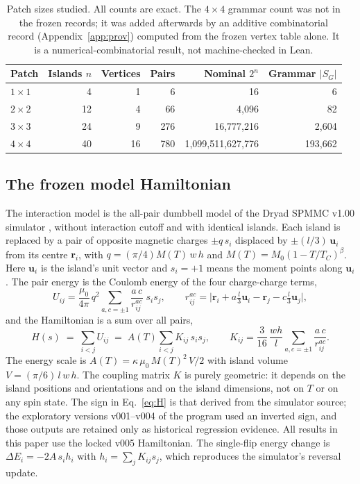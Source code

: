 \documentclass[11pt,a4paper]{article}
\theoremstyle{plain}
\theoremstyle{definition}
\theoremstyle{remark}
\newcommand{\SG}{S_{G}}
\begin{document}
\begin{table}[t]
\centering\small
\caption{Patch sizes studied. All counts are exact. The $4\times4$ grammar count was not in the frozen records; it was added afterwards by an additive combinatorial record (Appendix~\ref{app:prov}) computed from the frozen vertex table alone. It is a numerical-combinatorial result, not machine-checked in Lean.}
\label{tab:sizes}
\begin{tabular}{@{}lrrrrr@{}}
\toprule
Patch & Islands $n$ & Vertices & Pairs & Nominal $2^n$ & Grammar $|\SG|$\\
\midrule
$1\times1$ & 4 & 1 & 6 & 16 & 6\\
$2\times2$ & 12 & 4 & 66 & 4{,}096 & 82\\
$3\times3$ & 24 & 9 & 276 & 16{,}777{,}216 & 2{,}604\\
$4\times4$ & 40 & 16 & 780 & 1{,}099{,}511{,}627{,}776 & 193{,}662\\
\bottomrule
\end{tabular}
\end{table}

\subsection{The frozen model Hamiltonian}
The interaction model is the all-pair dumbbell model of the Dryad SPMMC v1.00 simulator \cite{Hurben2026}, without interaction cutoff and with identical islands. Each island is replaced by a pair of opposite magnetic charges $\pm q\,s_i$ displaced by $\pm(l/3)\,\mathbf u_i$ from its centre $\mathbf r_i$, with $q=(\pi/4)M(T)\,w\,h$ and $M(T)=M_0(1-T/T_C)^{\beta}$. Here $\mathbf u_i$ is the island's unit vector and $s_i=+1$ means the moment points along $\mathbf u_i$. The pair energy is the Coulomb energy of the four charge-charge terms,
\[
U_{ij}=\frac{\mu_0}{4\pi}\,q^2\sum_{a,c=\pm1}\frac{a\,c}{r^{ac}_{ij}}\;s_is_j,\qquad
r^{ac}_{ij}=\bigl|\mathbf r_i+a\tfrac{l}{3}\mathbf u_i-\mathbf r_j-c\tfrac{l}{3}\mathbf u_j\bigr|,
\]
and the Hamiltonian is a sum over all pairs,
\begin{equation}
H(s)\;=\;\sum_{i<j}U_{ij}\;=\;A(T)\sum_{i<j}K_{ij}\,s_is_j,\qquad
K_{ij}=\frac{3}{16}\,\frac{wh}{l}\sum_{a,c=\pm1}\frac{a\,c}{r^{ac}_{ij}}.
\label{eq:H}
\end{equation}
The energy scale is $A(T)=\kappa\,\mu_0\,M(T)^2\,V/2$ with island volume $V=(\pi/6)\,l\,w\,h$. The coupling matrix $K$ is purely geometric: it depends on the island positions and orientations and on the island dimensions, not on $T$ or on any spin state. The sign in Eq.~\eqref{eq:H} is that derived from the simulator source; the exploratory versions v001--v004 of the program used an inverted sign, and those outputs are retained only as historical regression evidence. All results in this paper use the locked v005 Hamiltonian. The single-flip energy change is $\Delta E_i=-2A\,s_ih_i$ with $h_i=\sum_jK_{ij}s_j$, which reproduces the simulator's reversal update.
\end{document}
